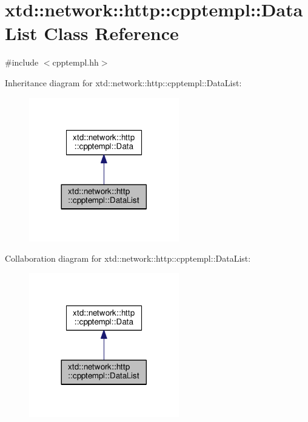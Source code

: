 \hypertarget{classxtd_1_1network_1_1http_1_1cpptempl_1_1DataList}{}\section{xtd\+:\+:network\+:\+:http\+:\+:cpptempl\+:\+:Data\+List Class Reference}
\label{classxtd_1_1network_1_1http_1_1cpptempl_1_1DataList}


{\ttfamily \#include $<$cpptempl.\+hh$>$}



Inheritance diagram for xtd\+:\+:network\+:\+:http\+:\+:cpptempl\+:\+:Data\+List\+:
\nopagebreak
\begin{figure}[H]
\begin{center}
\leavevmode
\includegraphics[width=185pt]{classxtd_1_1network_1_1http_1_1cpptempl_1_1DataList__inherit__graph}
\end{center}
\end{figure}


Collaboration diagram for xtd\+:\+:network\+:\+:http\+:\+:cpptempl\+:\+:Data\+List\+:
\nopagebreak
\begin{figure}[H]
\begin{center}
\leavevmode
\includegraphics[width=185pt]{classxtd_1_1network_1_1http_1_1cpptempl_1_1DataList__coll__graph}
\end{center}
\end{figure}
